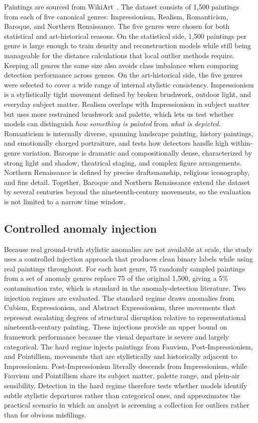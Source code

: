 \documentclass[conference]{IEEEtran}
\begin{document}
Paintings are sourced from WikiArt~\cite{wikiart}. The dataset consists of 1{,}500 paintings from each of five canonical genres: Impressionism, Realism, Romanticism, Baroque, and Northern Renaissance. The five genres were chosen for both statistical and art-historical reasons. On the statistical side, 1{,}500 paintings per genre is large enough to train density and reconstruction models while still being manageable for the distance calculations that local outlier methods require. Keeping all genres the same size also avoids class imbalance when comparing detection performance across genres. On the art-historical side, the five genres were selected to cover a wide range of internal stylistic consistency. Impressionism is a stylistically tight movement defined by broken brushwork, outdoor light, and everyday subject matter. Realism overlaps with Impressionism in subject matter but uses more restrained brushwork and palette, which lets us test whether models can distinguish \emph{how something is painted} from \emph{what is depicted}. Romanticism is internally diverse, spanning landscape painting, history paintings, and emotionally charged portraiture, and tests how detectors handle high within-genre variation. Baroque is dramatic and compositionally dense, characterized by strong light and shadow, theatrical staging, and complex figure arrangements. Northern Renaissance is defined by precise draftsmanship, religious iconography, and fine detail. Together, Baroque and Northern Renaissance extend the dataset by several centuries beyond the nineteenth-century movements, so the evaluation is not limited to a narrow time window.

\subsection{Controlled anomaly injection}

Because real ground-truth stylistic anomalies are not available at scale, the study uses a controlled injection approach that produces clean binary labels while using real paintings throughout. For each host genre, 75 randomly sampled paintings from a set of anomaly genres replace 75 of the original 1{,}500, giving a 5\% contamination rate, which is standard in the anomaly-detection literature. Two injection regimes are evaluated. The standard regime draws anomalies from Cubism, Expressionism, and Abstract Expressionism, three movements that represent escalating degrees of structural disruption relative to representational nineteenth-century painting. These injections provide an upper bound on framework performance because the visual departure is severe and largely categorical. The hard regime injects paintings from Fauvism, Post-Impressionism, and Pointillism, movements that are stylistically and historically adjacent to Impressionism. Post-Impressionism literally descends from Impressionism, while Fauvism and Pointillism share its subject matter, palette range, and plein-air sensibility. Detection in the hard regime therefore tests whether models identify subtle stylistic departures rather than categorical ones, and approximates the practical scenario in which an analyst is screening a collection for outliers rather than for obvious misfilings.
\end{document}
